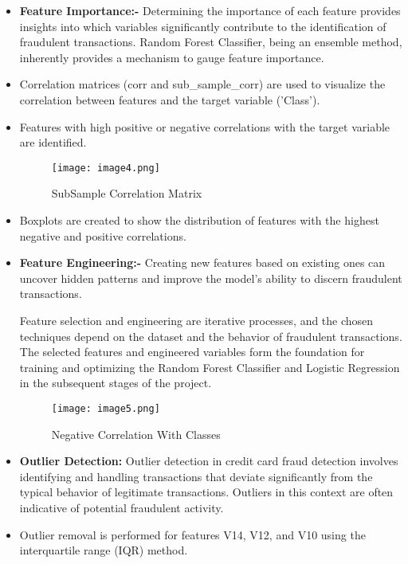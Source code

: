 \begin{itemize}
    \item \textbf{Feature Importance:-} Determining the importance of each feature provides insights into which variables significantly contribute to the identification of fraudulent transactions. Random Forest Classifier, being an ensemble method, inherently provides a mechanism to gauge feature importance.
    
    \item Correlation matrices (corr and sub\_sample\_corr) are used to visualize the correlation between features and the target variable ('Class').
    \item Features with high positive or negative correlations with the target variable are identified.
    \begin{figure}[h]
        \centering
        \texttt{[image: image4.png]}
        \caption{SubSample Correlation Matrix}
        \label{fig:enter-label}
    \end{figure}
    \item Boxplots are created to show the distribution of features with the highest negative and positive correlations.

  \item \textbf{Feature Engineering:-} Creating new features based on existing ones can uncover hidden patterns and improve the model's ability to discern fraudulent transactions.

  Feature selection and engineering are iterative processes, and the chosen techniques depend on the dataset and the behavior of fraudulent transactions. The selected features and engineered variables form the foundation for training and optimizing the Random Forest Classifier and Logistic Regression in the subsequent stages of the project.
   \begin{figure}[h]
       \centering
       \texttt{[image: image5.png]}
       \caption{Negative Correlation With Classes}
       \label{fig:enter-label}
   \end{figure}
   \item \textbf{Outlier Detection:} Outlier detection in credit card fraud detection involves identifying and handling transactions that deviate significantly from the typical behavior of legitimate transactions. Outliers in this context are often indicative of potential fraudulent activity. 
   \item Outlier removal is performed for features V14, V12, and V10 using the interquartile range (IQR) method.
   

\end{itemize}
